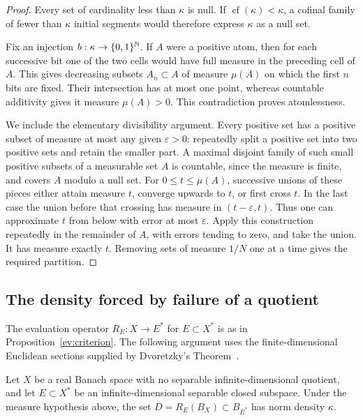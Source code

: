 \begin{proof}
Every set of cardinality less than $\kappa$ is null.  If
$\operatorname{cf}(\kappa)<\kappa$, a cofinal family of fewer than $\kappa$
initial segments would therefore express $\kappa$ as a null set.

Fix an injection $b:\kappa\to\{0,1\}^{\mathbb N}$.  If $A$ were a positive atom,
then for each successive bit one of the two cells would have full measure
in the preceding cell of $A$.  This gives decreasing subsets $A_n\subset A$
of measure $\mu(A)$ on which the first $n$ bits are fixed.  Their intersection
has at most one point, whereas countable additivity gives it measure
$\mu(A)>0$.  This contradiction proves atomlessness.

We include the elementary divisibility argument.  Every positive set has a
positive subset of measure at most any given $\varepsilon>0$: repeatedly
split a positive set into two positive sets and retain the smaller part.
A maximal disjoint family of such small positive subsets of a measurable
set $A$ is countable, since the measure is finite, and covers $A$ modulo a
null set.  For $0\le t\le\mu(A)$, successive unions of these pieces either
attain measure $t$, converge upwards to $t$, or first cross $t$.  In the
last case the union before that crossing has measure in
$(t-\varepsilon,t)$.  Thus one can approximate $t$ from below with error at
most $\varepsilon$.  Apply this construction repeatedly in the remainder
of $A$, with errors tending to zero, and take the union.  It has measure
exactly $t$.  Removing sets of measure $1/N$ one at a time gives the
required partition.
\end{proof}

\subsection{The density forced by failure of a quotient}

The evaluation operator $R_E:X\to E^*$ for $E\subset X^*$ is as in
Proposition~\ref{ev:criterion}.  The following argument uses the
finite-dimensional Euclidean sections supplied by Dvoretzky's
Theorem~\cite{Dvoretzky1961,Figiel1976}.

\begin{lemma}\label{pos:density}
Let $X$ be a real Banach space with no separable infinite-dimensional
quotient, and let $E\subset X^*$ be an infinite-dimensional separable
closed subspace.  Under the measure hypothesis above, the set
$D=R_E(B_X)\subset B_{E^*}$ has norm density $\kappa$.
\end{lemma}

